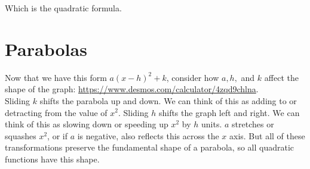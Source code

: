 \documentclass[10pt]{article}
\theoremstyle{definition}
\begin{document}
Which is the quadratic formula.

\section{Parabolas}

Now that we have this form $a(x-h)^2+k$, consider how $a,h,$ and $k$  affect the shape of the graph: \url{https://www.desmos.com/calculator/4zqd9chlna}.\\

Sliding $k$ shifts the parabola up and down.  We can think of this as adding to or detracting from the value of $x^2$.  Sliding $h$ shifts the graph left and right.  We can think of this as slowing down or speeding up $x^2$ by $h$ units.  $a$ stretches or squashes $x^2$, or if $a$ is negative, also reflects this across the $x$ axis.  But all of these transformations preserve the fundamental shape of a parabola, so all quadratic functions have this shape.
\end{document}
